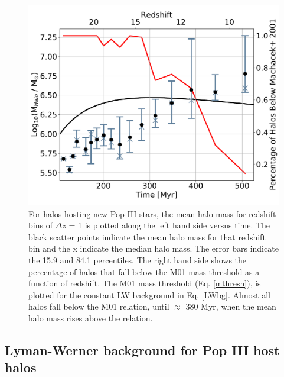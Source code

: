 \documentclass[a4paper,fleqn,usenatbib]{mnras}
\begin{document}
\begin{figure}
	\includegraphics[width=\columnwidth]{images/mean_mass_errorb_fix.pdf}
    \caption{For halos hosting new Pop III stars, the mean halo mass for redshift bins of $\Delta z$ = 1 is plotted along the left hand side versus time. The black scatter points indicate the mean halo mass for that redshift bin and the x indicate the median halo mass. The error bars indicate the 15.9 and 84.1 percentiles. The right hand side shows the percentage of halos that fall below the M01 mass threshold as a function of redshift. The M01 mass threshold (Eq. \ref{mthresh}), is plotted for the constant LW background in Eq. \ref{LWbg}. Almost all halos fall below the M01 relation, until $\approx$ 380 Myr, when the mean halo mass rises above the relation.}
    \label{fig:mean_mass}
\end{figure}

\subsection{Lyman-Werner background for Pop III host halos}
\end{document}
